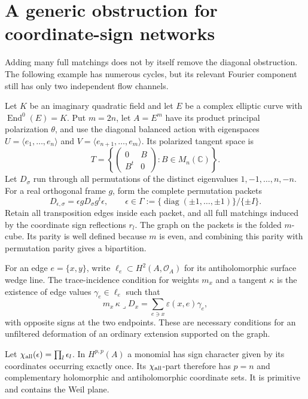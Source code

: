 \documentclass[11pt]{article}
\theoremstyle{definition}
\theoremstyle{remark}
\begin{document}
\section{A generic obstruction for coordinate-sign networks}
\label{sec:sign-cube-obstruction}

Adding many full matchings does not by itself remove the diagonal
obstruction.  The following example has numerous cycles, but its relevant
Fourier component still has only two independent flow channels.

Let \(K\) be an imaginary quadratic field and let \(E\) be a complex
elliptic curve with \(\operatorname{End}^0(E)=K\).
Put \(m=2n\), let \(A=E^{m}\) have its product principal polarization
\(\theta\), and use the diagonal balanced action with eigenspaces
\(U=\langle e_1,\ldots,e_n\rangle\) and
\(V=\langle e_{n+1},\ldots,e_m\rangle\).  Its polarized tangent space is
\[
 T=\left\{\begin{pmatrix}0&B\\B^t&0\end{pmatrix}:B\in M_n(\mathbb C)\right\}.
\]
Let \(D_\sigma\) run through all permutations of the distinct eigenvalues
\(1,-1,\ldots,n,-n\).  For a real orthogonal frame \(g\), form the complete
permutation packets
\[
 D_{\epsilon,\sigma}=\epsilon gD_\sigma g^t\epsilon,
 \qquad
 \epsilon\in\Gamma:=\{\operatorname{diag}(\pm1,\ldots,\pm1)\}/\{\pm I\}.
\]
Retain all transposition edges inside each packet, and all full matchings
induced by the coordinate sign reflections \(r_l\).
The graph on the packets is the folded \(m\)-cube.  Its parity is
well defined because \(m\) is even, and combining this parity with
permutation parity gives a bipartition.

For an edge \(e=\{x,y\}\), write \(\ell_e\subset H^2(A,\mathcal O_A)\)
for its antiholomorphic surface wedge line.  The trace-incidence
condition for weights \(m_x\) and a tangent \(\kappa\) is the existence
of edge values \(\gamma_e\in\ell_e\) such that
\[
 m_x\,\kappa\mathbin{\lrcorner}D_x
   =\sum_{e\ni x}\varepsilon(x,e)\gamma_e,
\]
with opposite signs at the two endpoints.  These are necessary
conditions for an unfiltered deformation of an ordinary extension
supported on the graph.

Let $\chi_{\rm all}(\epsilon)=\prod_l\epsilon_l$.
In $H^{p,p}(A)$ a monomial has sign character given by its coordinates
occurring exactly once.  Its $\chi_{\rm all}$-part therefore has
$p=n$ and complementary holomorphic and antiholomorphic coordinate sets.
It is primitive and contains the Weil plane.
\end{document}
